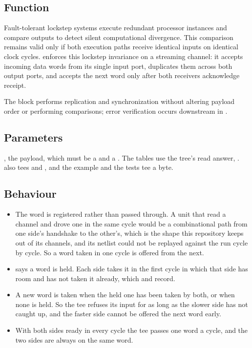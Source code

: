 
%
{}

\subsection*{Function}

Fault-tolerant lockstep systems execute redundant processor instances
and compare outputs to detect silent computational divergence. This
comparison remains valid only if both execution paths receive identical
inputs on identical clock cycles.  enforces this lockstep
invariance on a streaming channel: it accepts incoming data words from its
single input port, duplicates them across both output ports, and accepts the
next word only after both receivers acknowledge receipt.

The block performs replication and synchronization without altering payload
order or performing comparisons; error verification occurs downstream in
.

\subsection*{Parameters}

, the payload, which must be a  and a
. The tables use the tree's read answer,
.  also tees  and
, and the example and the tests tee a byte.


\subsection*{Behaviour}

\begin{itemize}
\item The word is registered rather than passed through. A unit that
read a channel and drove one in the same cycle would be a
combinational path from one side's handshake to the other's, which is
the shape this repository keeps out of its channels, and its netlist
could not be replayed against the run cycle by cycle. So a word taken
in one cycle is offered from the next.
\item {} says a word is held. Each side takes it in the first
cycle in which that side has room and has not taken it already, which
 and  record.
\item A new word is taken when the held one has been taken by both, or
when none is held. So the tee refuses its input for as long as the
slower side has not caught up, and the faster side cannot be offered
the next word early.
\item With both sides ready in every cycle the tee passes one word a
cycle, and the two sides are always on the same word.
\end{itemize}

